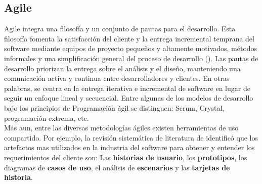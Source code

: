 \subsection{Agile}
Agile integra una filosofía y un conjunto de pautas para el desarrollo. Esta filosofía fomenta la satisfacción del cliente y la entrega incremental temprana del software mediante equipos de proyecto pequeños y altamente motivados, métodos informales y una simplificación general del proceso de desarrollo (\cite{pressman2005software}). Las pautas de desarrollo priorizan la entrega sobre el análisis y el diseño, manteniendo una comunicación activa y continua entre desarrolladores y clientes. En otras palabras, se centra en la entrega iterativa e incremental de software en lugar de seguir un enfoque lineal y secuencial. Entre algunas de los modelos de desarrollo bajo los principios de Programación ágil se distinguen: Scrum, Crystal, programación extrema, etc.\\ \indent
Más aun, entre las diversas metodologías ágiles existen herramientas de uso compartido. Por ejemplo, la revisión sistemática de literatura de \textcite{schon2017agile} identificó que los artefactos mas utilizados en la industria del software para obtener y entender los requerimientos del cliente son: Las \textbf{historias de usuario}, los \textbf{prototipos}, los diagramas de \textbf{casos de uso}, el análisis de \textbf{escenarios} y las \textbf{tarjetas de historia}.

